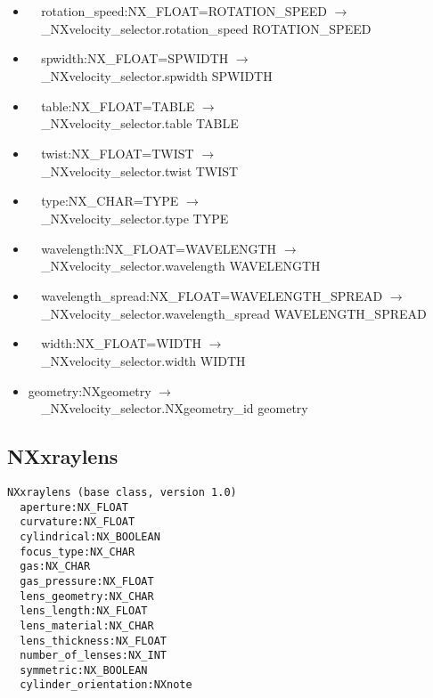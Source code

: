 \documentclass[11pt]{article}
\begin{document}
{{\begin{itemize}
\item{\verb|  |rotation\_speed:NX\_FLOAT=ROTATION\_SPEED $\rightarrow$\\
\verb|  |\_NXvelocity\_selector.rotation\_speed ROTATION\_SPEED}

\item{\verb|  |spwidth:NX\_FLOAT=SPWIDTH $\rightarrow$\\
\verb|  |\_NXvelocity\_selector.spwidth SPWIDTH}

\item{\verb|  |table:NX\_FLOAT=TABLE $\rightarrow$\\
\verb|  |\_NXvelocity\_selector.table TABLE}

\item{\verb|  |twist:NX\_FLOAT=TWIST $\rightarrow$\\
\verb|  |\_NXvelocity\_selector.twist TWIST}

\item{\verb|  |type:NX\_CHAR=TYPE $\rightarrow$\\
\verb|  |\_NXvelocity\_selector.type TYPE}

\item{\verb|  |wavelength:NX\_FLOAT=WAVELENGTH $\rightarrow$\\
\verb|  |\_NXvelocity\_selector.wavelength WAVELENGTH}

\item{\verb|  |wavelength\_spread:NX\_FLOAT=WAVELENGTH\_SPREAD $\rightarrow$\\
\verb|  |\_NXvelocity\_selector.wavelength\_spread WAVELENGTH\_SPREAD}

\item{\verb|  |width:NX\_FLOAT=WIDTH $\rightarrow$\\
\verb|  |\_NXvelocity\_selector.width WIDTH}

\item{geometry:NXgeometry $\rightarrow$\\
\verb|  |\_NXvelocity\_selector.NXgeometry\_id geometry}
\end{itemize}
\subsection{NXxraylens}

\begin{verbatim}
NXxraylens (base class, version 1.0)
  aperture:NX_FLOAT
  curvature:NX_FLOAT
  cylindrical:NX_BOOLEAN
  focus_type:NX_CHAR
  gas:NX_CHAR
  gas_pressure:NX_FLOAT
  lens_geometry:NX_CHAR
  lens_length:NX_FLOAT
  lens_material:NX_CHAR
  lens_thickness:NX_FLOAT
  number_of_lenses:NX_INT
  symmetric:NX_BOOLEAN
  cylinder_orientation:NXnote
\end{verbatim}

}}
\end{document}
